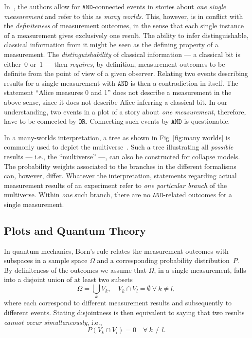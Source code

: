 \documentclass[aps,pra,12pt]{revtex4-2}
\newcommand{\AND}{\mathtt{AND}}
\newcommand{\OR}{\mathtt{OR}}
\theoremstyle{definition}
\theoremstyle{remark}
\begin{document}
In~\cite{FrRen}, the authors allow for $\AND$-connected events in stories about \emph{one single measurement} and refer to this as \emph{many worlds}. 
This, however, is in conflict with the \emph{definiteness} of measurement outcomes, in the sense that each single instance of a measurement gives exclusively one result. The ability to infer distinguishable, classical information from it might be seen as the defining property of a measurement.
The \emph{distinguishability} of classical information --- a classical bit is either~$0$ or~$1$ --- then \emph{requires}, by definition, measurement outcomes to be definite from the point of view of a given observer.
Relating two events describing results for a single measurement with $\AND$ is then a contradiction in itself. 
The statement ``Alice measures 0 and 1'' does not describe a measurement in the above sense, since it does not describe Alice inferring a classical bit.
In our understanding, two events in a plot of a story about \emph{one measurement}, therefore, have to be connected by $\OR$. 
Connecting such events by $\AND$ is questionable.

In a many-worlds interpretation, a tree as shown in Fig~\ref{fig:many worlds} is commonly used to depict the multiverse~\cite{wallace2012emergent}.
Such a tree illustrating all \emph{possible} results --- i.e., the ``multiverse'' ---, can also be constructed for collapse models. 
The probability weights associated to the branches in the different formalisms can, however, differ. 
Whatever the interpretation, statements regarding actual measurement results of an experiment refer to \emph{one particular branch} of the multiverse. 
Within \emph{one} such branch, there are no $\AND$-related outcomes for a single measurement.

\subsection{Plots and Quantum Theory}
\label{ssec:inf_qm}
\noindent
In quantum mechanics, Born's rule relates the measurement outcomes with subspaces in a sample space $\Omega$ and a corresponding probability distribution~$P$.
By definiteness of the outcomes we assume that $\Omega$, in a single measurement, falls into a disjoint union of at least two subsets
\begin{equation*}
  \Omega = \bigcup_k V_k, \quad V_k \cap V_l = \emptyset \ \forall \ k\neq l,
\end{equation*}
where each correspond to different measurement results and subsequently to different events. 
Stating disjointness is then equivalent to saying that two results \emph{cannot occur simultaneously}, i.e., 
\begin{equation*}
  P(V_k\cap V_l) = 0 \quad \forall \ k \neq l.
\end{equation*}
\end{document}
